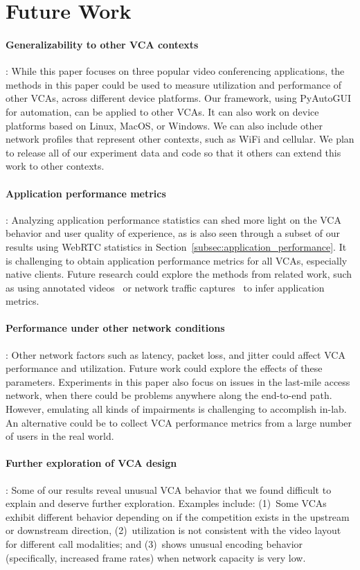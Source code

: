 \section{Future Work}
\label{sec:discussion}

\paragraph{Generalizability to other VCA contexts}: While this paper focuses on
three popular video conferencing applications, the methods in this paper could
be used to measure utilization and performance of other VCAs, across different
device platforms. Our framework, using PyAutoGUI for automation, can be
applied to other VCAs. It can also work on device platforms based on Linux,
MacOS, or Windows. We can also include other network profiles that represent
other contexts, such as WiFi and cellular. We plan to release all of our
experiment data and code so that it others can extend this work 
to other contexts.


\paragraph{Application performance metrics}: Analyzing application performance
statistics can shed more light on the VCA behavior and user quality of
experience, as is also seen through a subset of our results using WebRTC
statistics in Section~\ref{subsec:application_performance}. It is challenging
to obtain application performance metrics for all VCAs, especially native
clients. Future research could explore the methods from related work, such as
using annotated videos~\cite{xu2012video} or network traffic
captures~\cite{dasari2018scalable} to infer application metrics.

\paragraph{Performance under other network conditions}: Other network factors
such as latency, packet loss, and jitter could affect VCA performance and
utilization.  Future work could explore the effects of these parameters.
Experiments in this paper also focus on issues in the last-mile access
network, when there could be problems anywhere along the end-to-end path.
However, emulating all kinds of impairments is challenging to accomplish
in-lab. An alternative could be to collect VCA performance metrics from a
large number of users in the real world. 

\paragraph{Further exploration of VCA design}: Some of our results reveal
unusual VCA behavior that we found difficult to explain and deserve further
exploration. Examples include: (1)~Some VCAs exhibit different behavior
depending on if the competition exists in the upstream or downstream
direction, (2)~\teams utilization is not consistent with the video layout for
different call modalities; and (3)~\meet shows unusual encoding behavior
(specifically, increased frame rates) when network capacity is very low.
